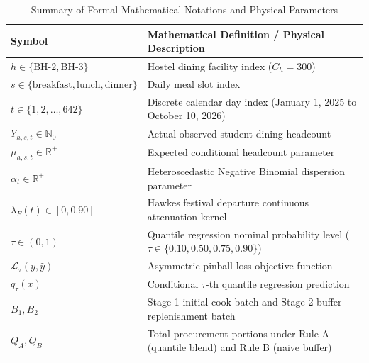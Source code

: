\documentclass[11pt,a4paper,oneside]{report}
\begin{document}
\begin{table}[ht]
\centering
\small
\renewcommand{\arraystretch}{1.2}
\begin{tabularx}{\textwidth}{lX}
\toprule
\rowcolor{bluelight}
\textbf{Symbol} & \textbf{Mathematical Definition / Physical Description} \\
\midrule
$h \in \{\text{BH-2}, \text{BH-3}\}$ & Hostel dining facility index ($C_h = 300$) \\
$s \in \{\text{breakfast}, \text{lunch}, \text{dinner}\}$ & Daily meal slot index \\
$t \in \{1, 2, \dots, 642\}$ & Discrete calendar day index (January 1, 2025 to October 10, 2026) \\
$Y_{h,s,t} \in \mathbb{N}_0$ & Actual observed student dining headcount \\
$\mu_{h,s,t} \in \mathbb{R}^+$ & Expected conditional headcount parameter \\
$\alpha_t \in \mathbb{R}^+$ & Heteroscedastic Negative Binomial dispersion parameter \\
$\lambda_F(t) \in [0, 0.90]$ & Hawkes festival departure continuous attenuation kernel \\
$\tau \in (0, 1)$ & Quantile regression nominal probability level ($\tau \in \{0.10, 0.50, 0.75, 0.90\}$) \\
$\mathcal{L}_\tau(y, \hat{y})$ & Asymmetric pinball loss objective function \\
$q_\tau(x)$ & Conditional $\tau$-th quantile regression prediction \\
$B_1, B_2$ & Stage 1 initial cook batch and Stage 2 buffer replenishment batch \\
$Q_A, Q_B$ & Total procurement portions under Rule A (quantile blend) and Rule B (naive buffer) \\
\bottomrule
\end{tabularx}
\caption{Summary of Formal Mathematical Notations and Physical Parameters}
\label{tab:notation}
\end{table}
\end{document}
